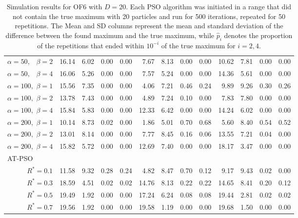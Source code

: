 \documentclass[12pt]{article}
\begin{document}
\begin{appendix}
\begin{table}[ht]
{\begin{tabular}{r|rrrr|rrrr|rrrr}
  $\alpha = 50,\enspace$ $\beta =2$ & 16.14 & 6.02 & 0.00 & 0.00 & 7.67 & 8.13 & 0.00 & 0.00 & 10.62 & 7.81 & 0.00 & 0.00 \\ 
  $\alpha = 50,\enspace$ $\beta =4$ & 16.06 & 5.26 & 0.00 & 0.00 & 7.57 & 5.24 & 0.00 & 0.00 & 14.36 & 5.61 & 0.00 & 0.00 \\ 
  $\alpha = 100,$ $\beta =1$ & 15.56 & 7.35 & 0.00 & 0.00 & 4.06 & 7.21 & 0.46 & 0.24 & 9.89 & 9.26 & 0.30 & 0.26 \\ 
  $\alpha = 100,$ $\beta =2$ & 13.78 & 7.43 & 0.00 & 0.00 & 4.89 & 7.24 & 0.10 & 0.00 & 7.83 & 7.80 & 0.00 & 0.00 \\ 
  $\alpha = 100,$ $\beta =4$ & 15.84 & 5.83 & 0.00 & 0.00 & 12.33 & 6.42 & 0.00 & 0.00 & 14.24 & 6.02 & 0.00 & 0.00 \\ 
  $\alpha = 200,$ $\beta =1$ & 10.14 & 8.73 & 0.02 & 0.00 & 1.86 & 5.01 & 0.70 & 0.68 & 5.60 & 8.40 & 0.54 & 0.52 \\ 
  $\alpha = 200,$ $\beta =2$ & 13.01 & 8.14 & 0.00 & 0.00 & 7.77 & 8.45 & 0.16 & 0.06 & 13.55 & 7.21 & 0.04 & 0.00 \\ 
  $\alpha = 200,$ $\beta =4$ & 15.82 & 5.72 & 0.00 & 0.00 & 12.69 & 7.40 & 0.00 & 0.00 & 18.17 & 3.47 & 0.00 & 0.00 \\ 
\hline
\multicolumn{1}{l|}{AT-PSO} &&&&&&&&&&&&\\
  $R^* = 0.1$ & 11.58 & 9.32 & 0.28 & 0.24 & 4.82 & 8.47 & 0.70 & 0.12 & 9.17 & 9.43 & 0.02 & 0.00 \\ 
  $R^* = 0.3$ & 18.59 & 4.51 & 0.02 & 0.02 & 14.76 & 8.13 & 0.22 & 0.22 & 14.65 & 8.41 & 0.20 & 0.12 \\ 
  $R^* = 0.5$ & 19.49 & 1.92 & 0.00 & 0.00 & 17.24 & 6.24 & 0.08 & 0.08 & 19.44 & 2.81 & 0.02 & 0.02 \\ 
  $R^* = 0.7$ & 19.56 & 1.92 & 0.00 & 0.00 & 19.58 & 1.19 & 0.00 & 0.00 & 19.68 & 1.50 & 0.00 & 0.00 \\ 
   \hline
\end{tabular}
}
\caption{Simulation results for OF6 with $D=20$. Each PSO algorithm was initiated in a range that did not contain the true maximum with 20 particles and run for 500 iterations, repeated for 50 repetitions. The Mean and SD columns represent the mean and standard deviation of the difference between the found maximum and the true maximum, while $\widehat{p}_i$ denotes the proportion of the repetitions that ended within $10^{-i}$ of the true maximum for $i=2,4$.}
\label{tab:psosim6}
\end{table}
\end{appendix}
\end{document}

